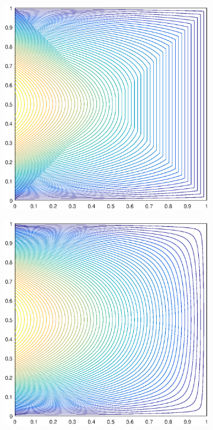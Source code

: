 \documentclass[11pt]{article}
\begin{document}
\begin{figure}
\begin{subfigure}[b]{0.25\textwidth}
		\includegraphics[width=\textwidth]{figures/square_PWLD2_contour_b8.eps}
		\caption{}
	\end{subfigure}
	\vfill
	\begin{subfigure}[b]{0.25\textwidth}
		\centering
		\includegraphics[width=\textwidth]{figures/square_MV2_contour_b8.eps}

\end{subfigure}
\end{figure}
\end{document}
